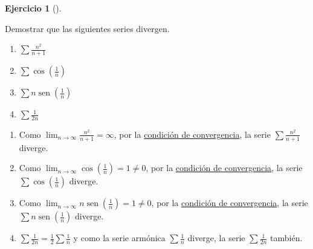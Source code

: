 \documentclass[
  spanish,
  a4paper,
]{scrreport}
\theoremstyle{definition}
\newtheorem{exercise}{Ejercicio}[chapter]
\theoremstyle{remark}
\begin{document}
\begin{exercise}[]\protect\hypertarget{exr-series-divergentes}{}\label{exr-series-divergentes}

Demostrar que las siguientes series divergen.

\begin{enumerate}
\def\labelenumi{\alph{enumi}.}
\item
  \(\sum \frac{n^2}{n+1}\)
\item
  \(\sum \cos\left(\frac{1}{n}\right)\)
\item
  \(\sum n\operatorname{sen}\left(\frac{1}{n}\right)\)
\item
  \(\sum \frac{1}{2n}\)
\end{enumerate}

\end{exercise}

\begin{tcolorbox}[enhanced jigsaw, arc=.35mm, bottomrule=.15mm, bottomtitle=1mm, breakable, colback=white, colbacktitle=quarto-callout-tip-color!10!white, colframe=quarto-callout-tip-color-frame, coltitle=black, left=2mm, leftrule=.75mm, opacityback=0, opacitybacktitle=0.6, rightrule=.15mm, title=\textcolor{quarto-callout-tip-color}{\faLightbulb}\hspace{0.5em}{Solución}, titlerule=0mm, toprule=.15mm, toptitle=1mm]

\begin{enumerate}
\def\labelenumi{\alph{enumi}.}
\item
  Como \(\lim_{n\to\infty} \frac{n^2}{n+1} = \infty\), por la
  \href{https://aprendeconalf.es/analisis-manual/08-series.html\#thm-condicion-convergencia-series}{condición
  de convergencia}, la serie \(\sum \frac{n^2}{n+1}\) diverge.
\item
  Como \(\lim_{n\to\infty}  \cos\left(\frac{1}{n}\right)=1\neq 0\), por
  la
  \href{https://aprendeconalf.es/analisis-manual/08-series.html\#thm-condicion-convergencia-series}{condición
  de convergencia}, la serie \(\sum \cos\left(\frac{1}{n}\right)\)
  diverge.
\item
  Como
  \(\lim_{n\to\infty}  n\operatorname{sen}\left(\frac{1}{n}\right)=1\neq 0\),
  por la
  \href{https://aprendeconalf.es/analisis-manual/08-series.html\#thm-condicion-convergencia-series}{condición
  de convergencia}, la serie
  \(\sum n\operatorname{sen}\left(\frac{1}{n}\right)\) diverge.
\item
  \(\sum \frac{1}{2n} = \frac{1}{2}\sum \frac{1}{n}\) y como la serie
  armónica \(\sum \frac{1}{n}\) diverge, la serie \(\sum \frac{1}{2n}\)
  también.
\end{enumerate}

\end{tcolorbox}
\end{document}

